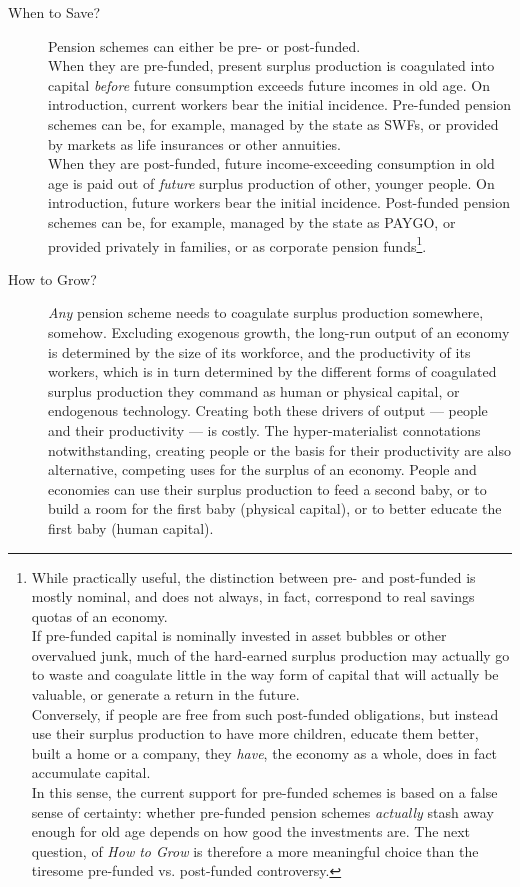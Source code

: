\begin{description}
	\item[When to Save?] Pension schemes can either be pre- or post-funded. \\
	When they are pre-funded, present surplus production is coagulated into capital \emph{before} future consumption exceeds future incomes in old age. On introduction, current workers bear the initial incidence. Pre-funded pension schemes can be, for example, managed by the state as \glspl{SWF}, or provided by markets as life insurances or other annuities.\\
	When they are post-funded, future income-exceeding consumption in old age is paid out of \emph{future} surplus production of other, younger people. On introduction, future workers bear the initial incidence. Post-funded pension schemes can be, for example, managed by the state as PAYGO, or provided privately in families, or as corporate pension funds\footnote{
		While practically useful, the distinction between pre- and post-funded is mostly nominal, and does not always, in fact, correspond to real savings quotas of an economy. \\
		If pre-funded capital is nominally invested in asset bubbles or other overvalued junk, much of the hard-earned surplus production may actually go to waste and coagulate little in the way form of capital that will actually be valuable, or generate a return in the future. \\
		Conversely, if people are free from such post-funded obligations, but instead use their surplus production to have more children, educate them better, built a home or a company, they \emph{have}, the economy as a whole, does in fact accumulate capital. \\
		In this sense, the current support for pre-funded schemes is based on a false sense of certainty: whether pre-funded pension schemes \emph{actually} stash away enough for old age depends on how good the investments are. The next question, of \emph{How to Grow} is therefore a more meaningful choice than the tiresome pre-funded vs. post-funded controversy.}.\\ 
	\item[How to Grow?] \emph{Any} pension scheme needs to coagulate surplus production somewhere, somehow. Excluding exogenous growth, the long-run output of an economy is determined by the size of its workforce, and the productivity of its workers, which is in turn determined by the different forms of coagulated surplus production they command as human or physical capital, or endogenous technology. Creating both these drivers of output --- people and their productivity --- is costly. The hyper-materialist connotations notwithstanding, creating people or the basis for their productivity are also alternative, competing uses for the surplus of an economy. People and economies can use their surplus production to feed a second baby, or to build a room for the first baby (physical capital), or to better educate the first baby (human capital). \\

\end{description}
